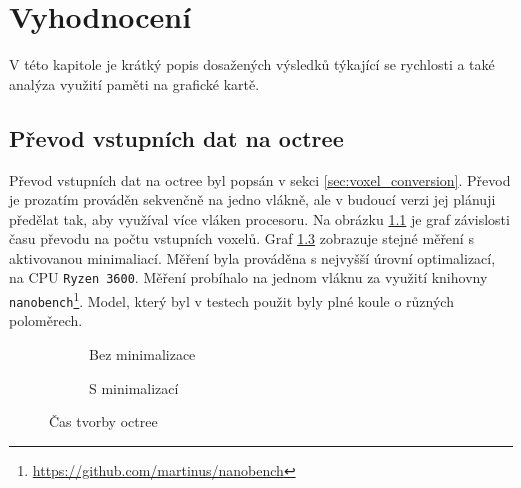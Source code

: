 \chapter{Vyhodnocení}
\label{testovani}
V této kapitole je krátký popis dosažených výsledků týkající se rychlosti a také analýza využití paměti na grafické kartě.

\section{Převod vstupních dat na octree}
Převod vstupních dat na octree byl popsán v sekci \ref{sec:voxel_conversion}. Převod je prozatím prováděn sekvenčně na jedno vlákně, ale v budoucí verzi jej plánuji předělat tak, aby využíval více vláken procesoru. Na obrázku \ref{fig:time_convert} je graf závislosti času převodu na počtu vstupních voxelů. Graf \ref{fig:time_convert_mini} zobrazuje stejné měření s aktivovanou minimaliací. Měření byla prováděna s nejvyšší úrovní optimalizací, na CPU \texttt{Ryzen 3600}. Měření probíhalo na jednom vláknu za využití knihovny \texttt{nanobench}\footnote{\url{https://github.com/martinus/nanobench}}. Model, který byl v testech použit byly plné koule o různých poloměrech.


\begin{figure}[H]
\begin{subfigure}{.5\textwidth}
\caption{Bez minimalizace}
\label{fig:time_convert}
\end{subfigure}
\begin{subfigure}{.5\textwidth}
\caption{S minimalizací}
\label{fig:time_convert_mini}
\end{subfigure}
\caption{Čas tvorby octree}
\end{figure}

